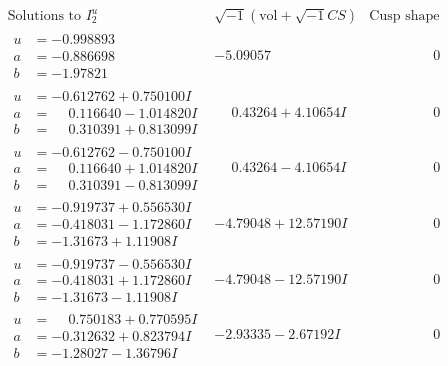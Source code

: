 \documentclass[1p]{elsarticle_modified}
\theoremstyle{definition}
\newcommand{\I}{\sqrt{-1}}
\begin{document}
$$\begin{array}{c|c|c}  
\text{Solutions to }I^u_{2}& \I (\text{vol} + \sqrt{-1}CS) & \text{Cusp shape}\\
 \hline 
\begin{aligned}
u &= -0.998893\phantom{ +0.000000I} \\
a &= -0.886698\phantom{ +0.000000I} \\
b &= -1.97821\phantom{ +0.000000I}\end{aligned}
 & -5.09057\phantom{ +0.000000I} & \phantom{-0.000000 } 0 \\ \hline\begin{aligned}
u &= -0.612762 + 0.750100 I \\
a &= \phantom{-}0.116640 - 1.014820 I \\
b &= \phantom{-}0.310391 + 0.813099 I\end{aligned}
 & \phantom{-}0.43264 + 4.10654 I & \phantom{-0.000000 } 0 \\ \hline\begin{aligned}
u &= -0.612762 - 0.750100 I \\
a &= \phantom{-}0.116640 + 1.014820 I \\
b &= \phantom{-}0.310391 - 0.813099 I\end{aligned}
 & \phantom{-}0.43264 - 4.10654 I & \phantom{-0.000000 } 0 \\ \hline\begin{aligned}
u &= -0.919737 + 0.556530 I \\
a &= -0.418031 - 1.172860 I \\
b &= -1.31673 + 1.11908 I\end{aligned}
 & -4.79048 + 12.57190 I & \phantom{-0.000000 } 0 \\ \hline\begin{aligned}
u &= -0.919737 - 0.556530 I \\
a &= -0.418031 + 1.172860 I \\
b &= -1.31673 - 1.11908 I\end{aligned}
 & -4.79048 - 12.57190 I & \phantom{-0.000000 } 0 \\ \hline\begin{aligned}
u &= \phantom{-}0.750183 + 0.770595 I \\
a &= -0.312632 + 0.823794 I \\
b &= -1.28027 - 1.36796 I\end{aligned}
 & -2.93335 - 2.67192 I & \phantom{-0.000000 } 0 \\ \hline\begin{aligned}

\end{aligned}
\end{array}$$
\end{document}
